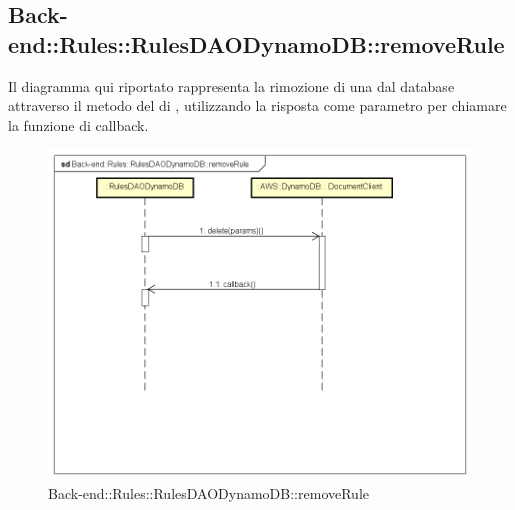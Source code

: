 \subsection{Back-end::Rules::RulesDAODynamoDB::removeRule}
Il diagramma qui riportato rappresenta la rimozione di una  dal database attraverso il metodo  del  di , utilizzando la risposta come parametro per chiamare la funzione di callback.
 \begin{figure}[h] \centering \includegraphics[width=\textwidth,height=\textheight,keepaspectratio]{images/diagrams/back-end/Ufficial_Backend/Back-endRulesRulesDAODynamoDBremoveRule.png} 	\caption{Back-end::Rules::RulesDAODynamoDB::removeRule}
\end{figure}
\newpage

